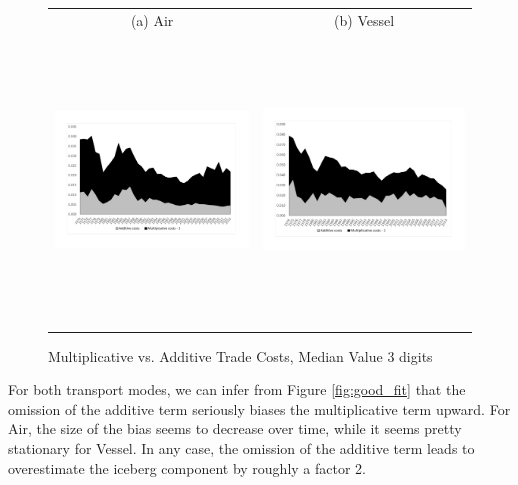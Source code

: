\documentclass[a4paper,11pt]{article}
\begin{document}
\begin{figure}[H]
\caption{Multiplicative vs. Additive Trade Costs, Median Value 3 digits}\label{fig:mult_vs_add}
\begin{center}
\begin{tabular}{cc}
{\small (a) Air } & {\small (b) Vessel}\\
\includegraphics[width=3.5in, height=3in]{graph2a.pdf}
& \includegraphics[width=3.5in,height=3in]{graph2b.pdf} \\
\end{tabular}
\end{center}
\end{figure}



For both transport modes, we can infer from Figure \ref{fig:good_fit} that the omission of the additive term seriously biases the multiplicative term upward. For Air, the size of the bias seems to decrease over time, while it seems pretty stationary for Vessel. In any case, the omission of the additive term leads to overestimate the iceberg component by roughly a factor 2. 
\end{document}

